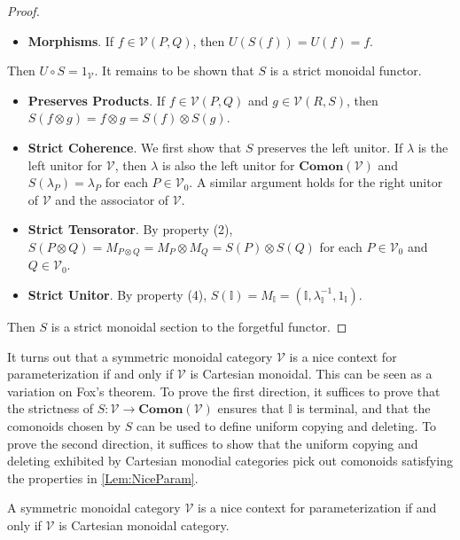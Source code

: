 \begin{proof}
\begin{itemize}
    \item \textbf{Morphisms}.
          If $f \in \mathcal{V}( P, Q )$, then $U( S( f ) ) = U( f ) = f$.
    \end{itemize}
    Then $U \circ S = 1_{\mathcal{V}}$.
    It remains to be shown that $S$ is a strict monoidal functor.
    \begin{itemize}
    \item \textbf{Preserves Products}.
          If $f \in \mathcal{V}( P, Q )$ and $g \in \mathcal{V}( R, S )$, then $S( f \otimes g ) = f \otimes g = S( f ) \otimes S( g )$.
    \item \textbf{Strict Coherence}.
          We first show that $S$ preserves the left unitor.
          If $\lambda$ is the left unitor for $\mathcal{V}$, then $\lambda$ is also the left unitor for $\mathbf{Comon}( \mathcal{V} )$ and $S( \lambda_P ) = \lambda_P$ for each $P \in \mathcal{V}_0$.
          A similar argument holds for the right unitor of $\mathcal{V}$ and the associator of $\mathcal{V}$.
    \item \textbf{Strict Tensorator}.
          By property (2), $S( P \otimes Q ) = M_{P \otimes Q} = M_P \otimes M_Q = S( P ) \otimes S( Q )$ for each $P \in \mathcal{V}_0$ and $Q \in \mathcal{V}_0$.
    \item \textbf{Strict Unitor}.
          By property (4), $S( \mathbb{I} ) = M_{\mathbb{I}} = ( \mathbb{I}, \lambda^{-1}_{\mathbb{I}}, 1_{\mathbb{I}} )$.
    \end{itemize}
    Then $S$ is a strict monoidal section to the forgetful functor.
\end{proof}

It turns out that a symmetric monoidal category $\mathcal{V}$ is a nice context for parameterization if and only if $\mathcal{V}$ is Cartesian monoidal.
This can be seen as a variation on Fox's theorem.
To prove the first direction, it suffices to prove that the strictness of $S: \mathcal{V} \to \mathbf{Comon}( \mathcal{V} )$ ensures that $\mathbb{I}$ is terminal, and that the comonoids chosen by $S$ can be used to define uniform copying and deleting.
To prove the second direction, it suffices to show that the uniform copying and deleting exhibited by Cartesian monodial categories pick out comonoids satisfying the properties in \cref{Lem:NiceParam}.

\begin{thm}
    \label{Thm:NiceParam}
    A symmetric monoidal category $\mathcal{V}$ is a nice context for parameterization if and only if $\mathcal{V}$ is Cartesian monoidal category.
\end{thm}

